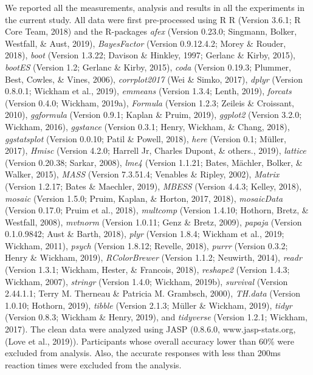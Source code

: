 \documentclass[man]{apa6}
\begin{document}
We reported all the measurements, analysis and results in all the experiments in the current study. All data were first pre-processed using R R (Version 3.6.1; R Core Team, 2018) and the R-packages \emph{afex} (Version 0.23.0; Singmann, Bolker, Westfall, \& Aust, 2019), \emph{BayesFactor} (Version 0.9.12.4.2; Morey \& Rouder, 2018), \emph{boot} (Version 1.3.22; Davison \& Hinkley, 1997; Gerlanc \& Kirby, 2015), \emph{bootES} (Version 1.2; Gerlanc \& Kirby, 2015), \emph{coda} (Version 0.19.3; Plummer, Best, Cowles, \& Vines, 2006), \emph{corrplot2017} (Wei \& Simko, 2017), \emph{dplyr} (Version 0.8.0.1; Wickham et al., 2019), \emph{emmeans} (Version 1.3.4; Lenth, 2019), \emph{forcats} (Version 0.4.0; Wickham, 2019a), \emph{Formula} (Version 1.2.3; Zeileis \& Croissant, 2010), \emph{ggformula} (Version 0.9.1; Kaplan \& Pruim, 2019), \emph{ggplot2} (Version 3.2.0; Wickham, 2016), \emph{ggstance} (Version 0.3.1; Henry, Wickham, \& Chang, 2018), \emph{ggstatsplot} (Version 0.0.10; Patil \& Powell, 2018), \emph{here} (Version 0.1; Müller, 2017), \emph{Hmisc} (Version 4.2.0; Harrell Jr, Charles Dupont, \& others., 2019), \emph{lattice} (Version 0.20.38; Sarkar, 2008), \emph{lme4} (Version 1.1.21; Bates, Mächler, Bolker, \& Walker, 2015), \emph{MASS} (Version 7.3.51.4; Venables \& Ripley, 2002), \emph{Matrix} (Version 1.2.17; Bates \& Maechler, 2019), \emph{MBESS} (Version 4.4.3; Kelley, 2018), \emph{mosaic} (Version 1.5.0; Pruim, Kaplan, \& Horton, 2017, 2018), \emph{mosaicData} (Version 0.17.0; Pruim et al., 2018), \emph{multcomp} (Version 1.4.10; Hothorn, Bretz, \& Westfall, 2008), \emph{mvtnorm} (Version 1.0.11; Genz \& Bretz, 2009), \emph{papaja} (Version 0.1.0.9842; Aust \& Barth, 2018), \emph{plyr} (Version 1.8.4; Wickham et al., 2019; Wickham, 2011), \emph{psych} (Version 1.8.12; Revelle, 2018), \emph{purrr} (Version 0.3.2; Henry \& Wickham, 2019), \emph{RColorBrewer} (Version 1.1.2; Neuwirth, 2014), \emph{readr} (Version 1.3.1; Wickham, Hester, \& Francois, 2018), \emph{reshape2} (Version 1.4.3; Wickham, 2007), \emph{stringr} (Version 1.4.0; Wickham, 2019b), \emph{survival} (Version 2.44.1.1; Terry M. Therneau \& Patricia M. Grambsch, 2000), \emph{TH.data} (Version 1.0.10; Hothorn, 2019), \emph{tibble} (Version 2.1.3; Müller \& Wickham, 2019), \emph{tidyr} (Version 0.8.3; Wickham \& Henry, 2019), and \emph{tidyverse} (Version 1.2.1; Wickham, 2017). The clean data were analyzed using JASP (0.8.6.0, www.jasp-stats.org, (Love et al., 2019)). Participants whose overall accuracy lower than 60\% were excluded from analysis. Also, the accurate responses with less than 200ms reaction times were excluded from the analysis.
\end{document}
